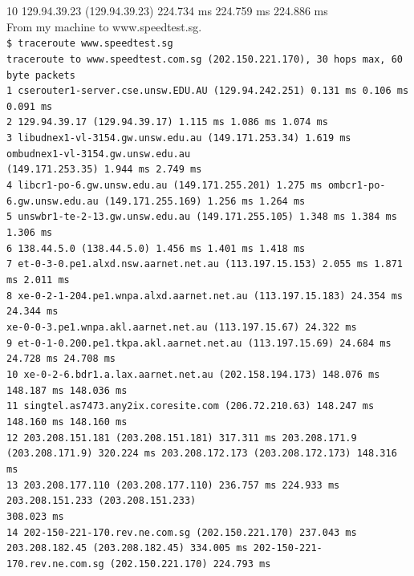 \documentclass[a4paper,11pt]{article}
\newcommand{\code}{\texttt}
\begin{document}
\begin{enumerate}[leftmargin=*]
\begin{enumerate}
{				10  129.94.39.23 (129.94.39.23)  224.734 ms  224.759 ms  224.886 ms\\}
				\break
				From my machine to www.speedtest.sg.\\
				\code{\scriptsize \$ traceroute www.speedtest.sg\\
				traceroute to www.speedtest.com.sg (202.150.221.170), 30 hops max, 60 byte packets\\
				 1  cserouter1-server.cse.unsw.EDU.AU (129.94.242.251)  0.131 ms  0.106 ms  0.091 ms\\
				 2  129.94.39.17 (129.94.39.17)  1.115 ms  1.086 ms  1.074 ms\\
				 3  libudnex1-vl-3154.gw.unsw.edu.au (149.171.253.34)  1.619 ms ombudnex1-vl-3154.gw.unsw.edu.au\\
				 (149.171.253.35)  1.944 ms  2.749 ms\\
				 4  libcr1-po-6.gw.unsw.edu.au (149.171.255.201)  1.275 ms ombcr1-po-6.gw.unsw.edu.au (149.171.255.169)  1.256 ms  1.264 ms\\
				 5  unswbr1-te-2-13.gw.unsw.edu.au (149.171.255.105)  1.348 ms  1.384 ms  1.306 ms\\
				 6  138.44.5.0 (138.44.5.0)  1.456 ms  1.401 ms  1.418 ms\\
				 7  et-0-3-0.pe1.alxd.nsw.aarnet.net.au (113.197.15.153)  2.055 ms  1.871 ms  2.011 ms\\
				 8  xe-0-2-1-204.pe1.wnpa.alxd.aarnet.net.au (113.197.15.183)  24.354 ms  24.344 ms\\
				 xe-0-0-3.pe1.wnpa.akl.aarnet.net.au (113.197.15.67)  24.322 ms\\
				 9  et-0-1-0.200.pe1.tkpa.akl.aarnet.net.au (113.197.15.69)  24.684 ms  24.728 ms  24.708 ms\\
				10  xe-0-2-6.bdr1.a.lax.aarnet.net.au (202.158.194.173)  148.076 ms  148.187 ms  148.036 ms\\
				11  singtel.as7473.any2ix.coresite.com (206.72.210.63)  148.247 ms  148.160 ms  148.160 ms\\
				12  203.208.151.181 (203.208.151.181)  317.311 ms 203.208.171.9 (203.208.171.9)  320.224 ms 203.208.172.173 (203.208.172.173)  148.316 ms\\
				13  203.208.177.110 (203.208.177.110)  236.757 ms  224.933 ms 203.208.151.233 (203.208.151.233)\\
				308.023 ms\\
			14  202-150-221-170.rev.ne.com.sg (202.150.221.170)  237.043 ms 203.208.182.45 (203.208.182.45)  334.005 ms 202-150-221-170.rev.ne.com.sg (202.150.221.170)  224.793 ms\\}


\end{enumerate}
\end{enumerate}
\end{document}
